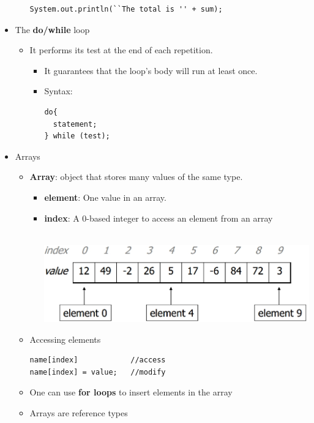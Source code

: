 \documentclass[a4paper]{article}
\begin{document}
\begin{itemize}
\begin{itemize}
\begin{lstlisting}
System.out.println(``The total is '' + sum);
    \end{lstlisting}
  \end{itemize}
\item The \textbf{do/while} loop
  \begin{itemize}
    \item It performs its test at the end of each repetition.
      \begin{itemize}
        \item It guarantees that the loop's { } body will run at least once.
        \item Syntax:
\begin{lstlisting}
do{
  statement;
} while (test);
\end{lstlisting}
      \end{itemize}
  \end{itemize}
\item Arrays
  \begin{itemize}
    \item \textbf{Array}: object that stores many values of the same type.
      \begin{itemize}
        \item \textbf{element}: One value in an array.
        \item \textbf{index}: A 0-based integer to access an element from an array\\
        \\
        \begin{center}
        \includegraphics[scale=1]{Figures/ArrayExample.jpg}
        \end{center}
      \end{itemize}
    \item Accessing elements\\
      \begin{lstlisting}
name[index]            //access
name[index] = value;   //modify
      \end{lstlisting}
      \item One can use \textbf{for loops} to insert elements in the array
      \item Arrays are reference types

\end{itemize}
\end{itemize}
\end{document}
